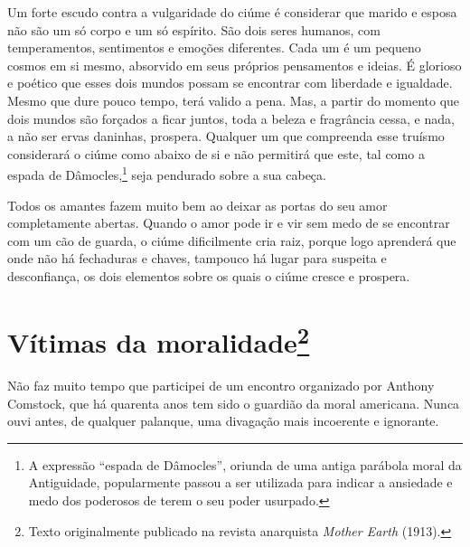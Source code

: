 Um forte escudo contra a vulgaridade do ciúme é considerar que marido e
esposa não são um só corpo e um só espírito. São dois seres humanos, com
temperamentos, sentimentos e emoções diferentes. Cada um é um pequeno
cosmos em si mesmo, absorvido em seus próprios pensamentos e ideias. É
glorioso e poético que esses dois mundos possam se encontrar com
liberdade e igualdade. Mesmo que dure pouco tempo, terá valido a pena.
Mas, a partir do momento que dois mundos são forçados a ficar juntos,
toda a beleza e fragrância cessa, e nada, a não ser ervas daninhas,
prospera. Qualquer um que compreenda esse truísmo considerará o ciúme
como abaixo de si e não permitirá que este, tal como a espada de
Dâmocles,\footnote{A expressão ``espada de Dâmocles'', oriunda de uma antiga parábola moral da Antiguidade, popularmente passou a ser utilizada para indicar a ansiedade e medo dos poderosos de terem o seu poder usurpado.} seja pendurado sobre a sua cabeça.

Todos os amantes fazem muito bem ao deixar as portas do seu amor
completamente abertas. Quando o amor pode ir e vir sem medo de se
encontrar com um cão de guarda, o ciúme dificilmente cria raiz, porque
logo aprenderá que onde não há fechaduras e chaves, tampouco há lugar
para suspeita e desconfiança, os dois elementos sobre os quais o ciúme
cresce e prospera.

\chapter{Vítimas da moralidade\footnote[*]{Texto originalmente publicado na revista
  anarquista \emph{Mother Earth} (1913).}}

Não faz muito tempo que participei de um encontro organizado por Anthony
Comstock, que há quarenta anos tem sido o guardião da moral americana.
Nunca ouvi antes, de qualquer palanque, uma divagação mais incoerente e
ignorante.

